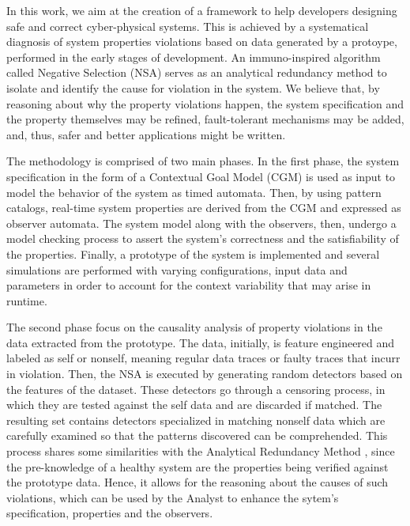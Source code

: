 In this work, we aim at the creation of a framework to help developers designing safe and correct cyber-physical systems. This is achieved by a systematical diagnosis of system properties violations based on data generated by a protoype, performed in the early stages of development. An immuno-inspired algorithm called Negative Selection (NSA) serves as an analytical redundancy method to isolate and identify the cause for violation in the system. We believe that, by reasoning about why the property violations happen, the system specification and the property themselves may be refined, fault-tolerant mechanisms may be added, and, thus, safer and better applications might be written.

The methodology is comprised of two main phases. In the first phase, the system specification in the form of a Contextual Goal Model (CGM) is used as input to model the behavior of the system as timed automata. Then, by using pattern catalogs, real-time system properties are derived from the CGM and expressed as observer automata. The system model along with the observers, then, undergo a model checking process to assert the system's correctness and the satisfiability of the properties. Finally, a prototype of the system is implemented and several simulations are performed with varying configurations, input data and parameters in order to account for the context variability that may arise in runtime. 

The second phase focus on the causality analysis of property violations in the data extracted from the prototype. The data, initially, is feature engineered and labeled as self or nonself, meaning regular data traces or faulty traces that incurr in violation. Then, the NSA is executed by generating random detectors based on the features of the dataset. These detectors go through a censoring process, in which they are tested against the self data and are discarded if matched. The resulting set contains detectors specialized in matching nonself data which are carefully examined so that the patterns discovered can be comprehended. This process shares some similarities with the Analytical Redundancy Method \cite{gao2015survey}, since the pre-knowledge of a healthy system are the properties being verified against the prototype data. Hence, it allows for the reasoning about the causes of such violations, which can be used by the Analyst to enhance the sytem's specification, properties and the observers.

